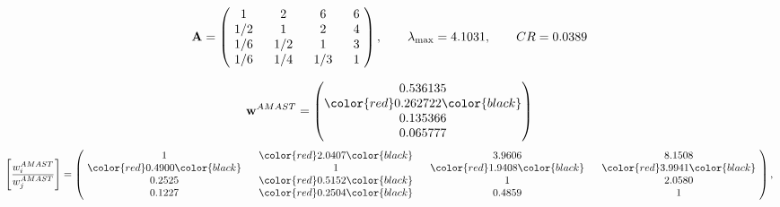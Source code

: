 \begin{example}
\begin{equation*}
\mathbf{A} =
\begin{pmatrix}
$\,\,$ 1 $\,\,$ & $\,\,$2$\,\,$ & $\,\,$6$\,\,$ & $\,\,$6 $\,\,$ \\
$\,\,$ 1/2$\,\,$ & $\,\,$ 1 $\,\,$ & $\,\,$2$\,\,$ & $\,\,$4 $\,\,$ \\
$\,\,$ 1/6$\,\,$ & $\,\,$ 1/2$\,\,$ & $\,\,$ 1 $\,\,$ & $\,\,$3 $\,\,$ \\
$\,\,$ 1/6$\,\,$ & $\,\,$ 1/4$\,\,$ & $\,\,$ 1/3$\,\,$ & $\,\,$ 1  $\,\,$ \\
\end{pmatrix},
\qquad
\lambda_{\max} =
4.1031,
\qquad
CR = 0.0389
\end{equation*}

\begin{equation*}
\mathbf{w}^{AMAST} =
\begin{pmatrix}
0.536135\\
\color{red} 0.262722\color{black} \\
0.135366\\
0.065777
\end{pmatrix}\end{equation*}
\begin{equation*}
\left[ \frac{{w}^{AMAST}_i}{{w}^{AMAST}_j} \right] =
\begin{pmatrix}
$\,\,$ 1 $\,\,$ & $\,\,$\color{red} 2.0407\color{black} $\,\,$ & $\,\,$3.9606$\,\,$ & $\,\,$8.1508$\,\,$ \\
$\,\,$\color{red} 0.4900\color{black} $\,\,$ & $\,\,$ 1 $\,\,$ & $\,\,$\color{red} 1.9408\color{black} $\,\,$ & $\,\,$\color{red} 3.9941\color{black}   $\,\,$ \\
$\,\,$0.2525$\,\,$ & $\,\,$\color{red} 0.5152\color{black} $\,\,$ & $\,\,$ 1 $\,\,$ & $\,\,$2.0580 $\,\,$ \\
$\,\,$0.1227$\,\,$ & $\,\,$\color{red} 0.2504\color{black} $\,\,$ & $\,\,$0.4859$\,\,$ & $\,\,$ 1  $\,\,$ \\
\end{pmatrix},
\end{equation*}


\end{example}
